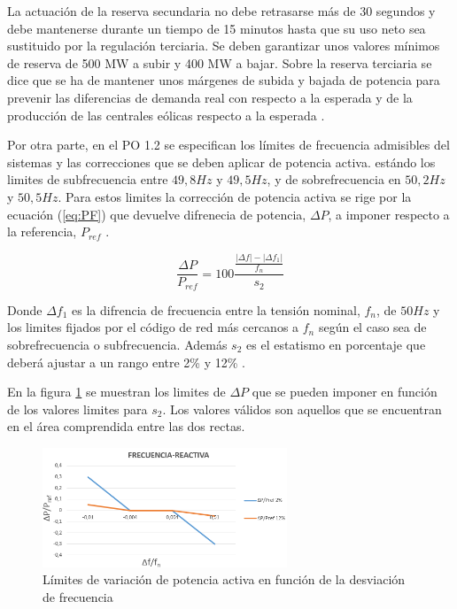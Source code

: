 \documentclass{book}
\begin{document}
La actuaci\'on de la reserva secundaria no debe retrasarse m\'as de 30 segundos y debe mantenerse durante un tiempo de 15 minutos hasta que su uso neto sea sustituido por la regulaci\'on terciaria. Se deben garantizar unos valores m\'inimos de reserva de 500 MW a subir y 400 MW a bajar. Sobre la reserva terciaria se dice que se ha de mantener unos m\'argenes de subida y bajada de potencia para prevenir las diferencias de demanda real con respecto a la esperada y de la producci\'on de las centrales e\'olicas respecto a la esperada \cite{PO15}. \par

Por otra parte, en el PO 1.2 se especifican los l\'imites de frecuencia admisibles del sistemas y las correcciones que se deben aplicar de potencia activa. est\'ando los limites de subfrecuencia entre $49,8Hz$ y $49,5Hz$, y de sobrefrecuencia en $50,2Hz$ y $50,5Hz$. Para estos limites la correcci\'on de potencia activa se rige por la ecuaci\'on (\ref{eq:PF}) que devuelve difrenecia de potencia, $\Delta P$, a imponer respecto a la referencia, $P_{ref}$ \cite{PO12}. \par

\begin{equation}\label{eq:PF}
	\frac{\Delta P}{P_{ref}}=100 \frac{\frac{|\Delta f|-|\Delta f_1|}{f_n}}{s_2}
\end{equation} \par

Donde $\Delta f_1$ es la difrencia de frecuencia entre la tensión nominal, $f_n$, de $50Hz$ y los limites fijados por el c\'odigo de red m\'as cercanos a $f_n$ seg\'un el caso sea de sobrefrecuencia o subfrecuencia. Adem\'as $s_2$ es el estatismo en porcentaje que deber\'a ajustar a un rango entre 2\% y 12\% \cite{PO12}. \par

En la figura \ref{FPgridcode} se muestran los limites de $\Delta P$ que se pueden imponer en funci\'on de los valores limites para $s_2$. Los valores v\'alidos son aquellos que se encuentran en el \'area comprendida entre las dos rectas. 

\begin{figure}[h!]
\centering
\includegraphics[width=0.65\textwidth]{FPgridcode.PNG}
\caption{L\'imites de variaci\'on de potencia activa en funci\'on de la desviaci\'on de frecuencia}
\label{FPgridcode}
\end{figure}
\end{document}
